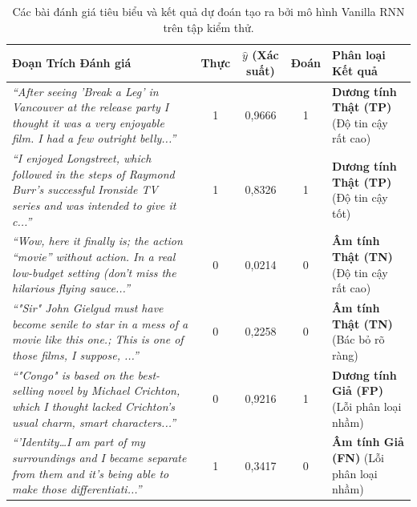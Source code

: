 \documentclass[11pt,a4paper]{article}
\begin{document}
\begin{table}[H]
\centering
\small
\begin{tabular}{p{7.2cm}cccp{2.6cm}}
\toprule
\textbf{Đoạn Trích Đánh giá} & \textbf{Thực} & \textbf{$\hat{y}$ (Xác suất)} & \textbf{Đoán} & \textbf{Phân loại Kết quả} \\
\midrule
\textit{``After seeing 'Break a Leg' in Vancouver at the release party I thought it was a very enjoyable film. I had a few outright belly...''} & 1 & 0,9666 & 1 & \textbf{Dương tính Thật (TP)} (Độ tin cậy rất cao) \\
\midrule
\textit{``I enjoyed Longstreet, which followed in the steps of Raymond Burr's successful Ironside TV series and was intended to give it c...''} & 1 & 0,8326 & 1 & \textbf{Dương tính Thật (TP)} (Độ tin cậy tốt) \\
\midrule
\textit{``Wow, here it finally is; the action ``movie'' without action. In a real low-budget setting (don't miss the hilarious flying sauce...''} & 0 & 0,0214 & 0 & \textbf{Âm tính Thật (TN)} (Độ tin cậy rất cao) \\
\midrule
\textit{``"Sir" John Gielgud must have become senile to star in a mess of a movie like this one.; This is one of those films, I suppose, ...''} & 0 & 0,2258 & 0 & \textbf{Âm tính Thật (TN)} (Bác bỏ rõ ràng) \\
\midrule
\textit{``"Congo" is based on the best-selling novel by Michael Crichton, which I thought lacked Crichton's usual charm, smart characters...''} & 0 & 0,9216 & 1 & \textbf{Dương tính Giả (FP)} (Lỗi phân loại nhầm) \\
\midrule
\textit{``'Identity\dots I am part of my surroundings and I became separate from them and it's being able to make those differentiati...''} & 1 & 0,3417 & 0 & \textbf{Âm tính Giả (FN)} (Lỗi phân loại nhầm) \\
\bottomrule
\end{tabular}
\caption{Các bài đánh giá tiêu biểu và kết quả dự đoán tạo ra bởi mô hình Vanilla RNN trên tập kiểm thử.}
\label{tab:sample_preds}
\end{table}
\end{document}
